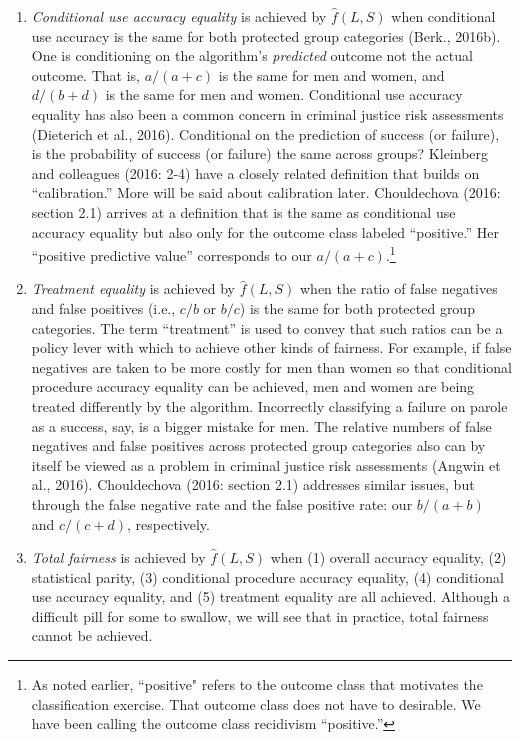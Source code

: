 \documentclass[12pt]{article}
\begin{document}
\begin{enumerate}
{
One of the two outcome classes is deemed more desirable, and that is the outcome class for which there is conditional procedure accuracy equality. In criminal justice settings, it can be unclear which outcome class is more desirable. Is an arrest for burglary more or less desirable than an arrest for a straw purchase of a firearm? But if one outcome class is recidivism and the other outcome class is no recidivism, equality of opportunity refers to conditional procedure accuracy equality for those who did not recidivate. 
}
\item
\textit{Conditional use accuracy equality} is achieved by $\hat{f}(L,S)$ when conditional use accuracy is the same for both protected group categories (Berk., 2016b).  One is conditioning on the algorithm's \textit{predicted} outcome not the actual outcome. That is, $a/(a+c)$ is the same for men and women, and $d/(b+d)$ is the same for men and women.  Conditional use accuracy equality has also been a common concern in criminal justice risk assessments (Dieterich et al., 2016). Conditional on the prediction of success (or failure), is the probability of success (or failure) the same across groups? Kleinberg and colleagues (2016: 2-4) have a closely related definition that builds on ``calibration.'' More will be said about calibration later. Chouldechova (2016:  section 2.1) arrives at a definition that is the same as conditional use accuracy equality but also only for the outcome class labeled ``positive.'' Her ``positive predictive value'' corresponds to our $a/(a+c)$.\footnote
{
As noted earlier, ``positive" refers to the outcome class that motivates the classification exercise. That outcome class does not have to desirable. We have been calling the outcome class recidivism ``positive.'' 
} 
\item
\textit{Treatment equality} is achieved by $\hat{f}(L,S)$ when the ratio of false negatives and false positives (i.e., $c/b$ or $b/c$) is the same for both protected group categories. The term ``treatment'' is used to convey that such ratios can be a policy lever with which to achieve other kinds of fairness. For example, if false negatives are taken to be more costly for men than women so that conditional procedure accuracy equality can be achieved, men and women are being treated differently by the algorithm. Incorrectly classifying a failure on parole as a success, say, is a bigger mistake for men. The relative numbers of false negatives and false positives across protected group categories also can by itself be viewed as a problem in criminal justice risk assessments (Angwin et al., 2016). Chouldechova (2016: section 2.1) addresses similar issues, but through the false negative rate and the false positive rate: our $b/(a+b)$ and $c/(c+d)$, respectively. 
\item
\textit{Total fairness} is achieved  by $\hat{f}(L,S)$ when (1) overall accuracy equality, (2) statistical parity, (3) conditional procedure accuracy equality, (4) conditional use accuracy equality, and (5) treatment equality are all achieved. Although a difficult pill for some to swallow, we will see that in practice, total fairness cannot be achieved.
\end{enumerate}
\end{document}
